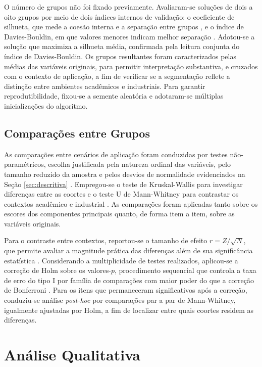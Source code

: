 O número de grupos não foi fixado previamente. Avaliaram-se soluções de dois a oito grupos por meio de dois índices internos de validação: o coeficiente de silhueta, que mede a coesão interna e a separação entre grupos \cite{rousseeuw1987}, e o índice de Davies-Bouldin, em que valores menores indicam melhor separação \cite{daviesbouldin1979}. Adotou-se a solução que maximiza a silhueta média, confirmada pela leitura conjunta do índice de Davies-Bouldin. Os grupos resultantes foram caracterizados pelas médias das variáveis originais, para permitir interpretação substantiva, e cruzados com o contexto de aplicação, a fim de verificar se a segmentação reflete a distinção entre ambientes acadêmicos e industriais. Para garantir reprodutibilidade, fixou-se a semente aleatória e adotaram-se múltiplas inicializações do algoritmo.

\subsection{Comparações entre Grupos}
\label{sec:comparacoes-grupos}

As comparações entre cenários de aplicação foram conduzidas por testes não-paramétricos, escolha justificada pela natureza ordinal das variáveis, pelo tamanho reduzido da amostra e pelos desvios de normalidade evidenciados na Seção \ref{sec:descritiva} \cite{field2018}. Empregou-se o teste de Kruskal-Wallis para investigar diferenças entre as coortes \cite{kruskalwallis1952} e o teste U de Mann-Whitney para contrastar os contextos acadêmico e industrial \cite{mannwhitney1947}. As comparações foram aplicadas tanto sobre os escores dos componentes principais quanto, de forma item a item, sobre as variáveis originais.

Para o contraste entre contextos, reportou-se o tamanho de efeito \(r = Z/\sqrt{N}\), que permite avaliar a magnitude prática das diferenças além de sua significância estatística \cite{field2018}. Considerando a multiplicidade de testes realizados, aplicou-se a correção de Holm sobre os valores-\(p\), procedimento sequencial que controla a taxa de erro do tipo I por família de comparações com maior poder do que a correção de Bonferroni \cite{holm1979}. Para os itens que permaneceram significativos após a correção, conduziu-se análise \textit{post-hoc} por comparações par a par de Mann-Whitney, igualmente ajustadas por Holm, a fim de localizar entre quais coortes residem as diferenças.

\section{Análise Qualitativa}
\label{sec:qualitativa}

